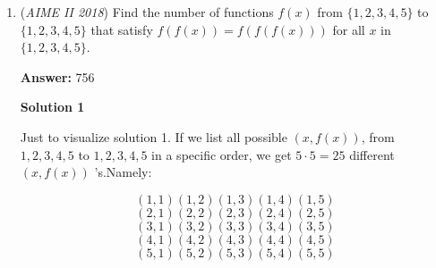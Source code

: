 \begin{enumerate}
 \textbf{Supplement} Note that we use $17.$ A proof of this is as follows:

 
            \begin{itemize}
        \item First, note that the shaded triangles are 6-8-10 triangles. Because the homothety is defined on the midpoints of the sides of the octagon, the smaller triangle created by that midpoint and the surrounding rectangle has sides 3-4-5. Thus, the sidelength of the octagon (17) is just 23-2*3=17.
            \end{itemize}
            



\textbf{Solution 3 (Less bashy finish than shoelace)}

Instead of bashing shoelace, we can find a clever way to calculate the area of the heptagon without using homothety. By connecting the centroids of $\bigtriangleup JAB, \bigtriangleup JCD$, $\bigtriangleup JHG, \bigtriangleup JFE$, and $\bigtriangleup JFE, \bigtriangleup JCD$. This will give us three triangles and a rectangle. The area of the rectangle is $\frac{34}{3}*\frac{38}{3}$, the top and bottom triangles each give $\frac{38}{3}*2*\frac{1}{2}$, and the triangle on the right yields $\frac{34}{3}*\frac{8}{3}*\frac{1}{2}$ by using $\frac{bh}{2}$. Summing them up, we get $\frac{1656}{9}$, which gives us $\boxed{184}$.~boppitybobii

 


	\item (\textit{AIME II 2018}) Find the number of functions $f(x)$ from $\{1, 2, 3, 4, 5\}$ to $\{1, 2, 3, 4, 5\}$ that satisfy $f(f(x)) = f(f(f(x)))$ for all $x$ in $\{1, 2, 3, 4, 5\}$.


 
 \textbf{Answer: }756



\textbf{Solution 1}

Just to visualize solution 1. If we list all possible $(x,f(x))$, from ${1,2,3,4,5}$ to ${1,2,3,4,5}$ in a specific order, we get $5 \cdot 5 = 25$ different $(x,f(x))$ 's.Namely:

 
 \[(1,1) (1,2) (1,3) (1,4) (1,5)\]
 \[(2,1) (2,2) (2,3) (2,4) (2,5)\] 
 \[(3,1) (3,2) (3,3) (3,4) (3,5)\] 
 \[(4,1) (4,2) (4,3) (4,4) (4,5)\]
 \[(5,1) (5,2) (5,3) (5,4) (5,5)\]


\end{enumerate}
